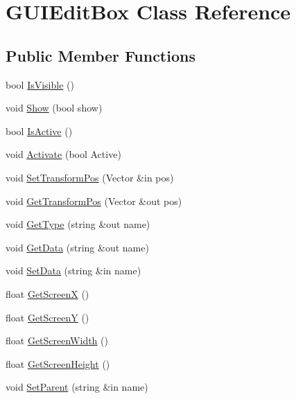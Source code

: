 \hypertarget{class_g_u_i_edit_box}{}\section{G\+U\+I\+Edit\+Box Class Reference}
\label{class_g_u_i_edit_box}
\subsection*{Public Member Functions}
\begin{DoxyCompactItemize}
\item 
bool \hyperlink{class_g_u_i_edit_box_a25dcd1e9bac37350c79767edcf463d67}{Is\+Visible} ()
\item 
void \hyperlink{class_g_u_i_edit_box_a8177e1d42fc17571f3f427f3637b58f2}{Show} (bool show)
\item 
bool \hyperlink{class_g_u_i_edit_box_ae9a25ccf09a1d90efc3df7b5a3e2eb8c}{Is\+Active} ()
\item 
void \hyperlink{class_g_u_i_edit_box_a6a66f7950e739733ab8b24bef783eca1}{Activate} (bool Active)
\item 
void \hyperlink{class_g_u_i_edit_box_a4385823fa2e13a49e84f229dfa8d5cdc}{Set\+Transform\+Pos} (Vector \&in pos)
\item 
void \hyperlink{class_g_u_i_edit_box_a168aec0139b940f093c1472e96050c13}{Get\+Transform\+Pos} (Vector \&out pos)
\item 
void \hyperlink{class_g_u_i_edit_box_a1753fafb38c651d67fb2b8b33b4d5845}{Get\+Type} (string \&out name)
\item 
void \hyperlink{class_g_u_i_edit_box_a5100480531fe51881142d81bdb701b42}{Get\+Data} (string \&out name)
\item 
void \hyperlink{class_g_u_i_edit_box_a919189b0306c7bc94bd6cf648d7936a9}{Set\+Data} (string \&in name)
\item 
float \hyperlink{class_g_u_i_edit_box_a083c42a34076f31398a5bbb569593ed5}{Get\+ScreenX} ()
\item 
float \hyperlink{class_g_u_i_edit_box_af785fc3daf602a651da0e158033d8b96}{Get\+ScreenY} ()
\item 
float \hyperlink{class_g_u_i_edit_box_a9e16103494ffe2213cb73340f2efd537}{Get\+Screen\+Width} ()
\item 
float \hyperlink{class_g_u_i_edit_box_a4cdc6ac26ffd8e910724ed3782ae4b45}{Get\+Screen\+Height} ()
\item 
void \hyperlink{class_g_u_i_edit_box_a4a93751c5be2da3058db9d95be56adfc}{Set\+Parent} (string \&in name)

\end{DoxyCompactItemize}
